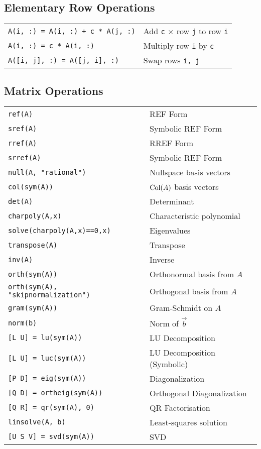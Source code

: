 \documentclass[12pt, a4paper]{article}
\begin{document}
\begin{multicols*}{3}
\subsection{Elementary Row Operations}
\begin{tabular}{ll}
  \verb|A(i, :) = A(i, :) + c * A(j, :)| & Add \verb|c| $\times$ row \verb|j| to row \verb|i|\\
  \verb|A(i, :) = c * A(i, :)| & Multiply row \verb|i| by \verb|c|\\
  \verb|A([i, j], :) = A([j, i], :)| & Swap rows \verb|i, j|\\
\end{tabular}

\colbreak
\subsection{Matrix Operations}
\begin{tabular}{ll}
  \verb|ref(A)| & REF Form\\
  \verb|sref(A)| & Symbolic REF Form\\
  \verb|rref(A)| & RREF Form\\
  \verb|srref(A)| & Symbolic REF Form\\
  \verb|null(A, "rational")| & Nullspace basis vectors\\
  \verb|col(sym(A))| & $\operatorname{Col}(A)$ basis vectors\\
  \verb|det(A)| & Determinant\\
  \verb|charpoly(A,x)| & Characteristic polynomial\\
  \verb|solve(charpoly(A,x)==0,x)| & Eigenvalues\\
  \verb|transpose(A)| & Transpose \\
  \verb|inv(A)| & Inverse \\
  \verb|orth(sym(A))| & Orthonormal basis from $A$ \\
  \verb|orth(sym(A), "skipnormalization")| & Orthogonal basis from $A$ \\
  \verb|gram(sym(A))| & Gram-Schmidt on $A$ \\
  \verb|norm(b)| & Norm of $\vec{b}$\\
  \verb|[L U] = lu(sym(A))| & LU Decomposition \\
  \verb|[L U] = luc(sym(A))| & LU Decomposition (Symbolic) \\
  \verb|[P D] = eig(sym(A))| & Diagonalization \\
  \verb|[Q D] = ortheig(sym(A))| & Orthogonal Diagonalization \\
  \verb|[Q R] = qr(sym(A), 0)| & QR Factorisation \\
  \verb|linsolve(A, b)| & Least-squares solution \\
  \verb|[U S V] = svd(sym(A))| & SVD \\
\end{tabular}


\end{multicols*}
\end{document}

